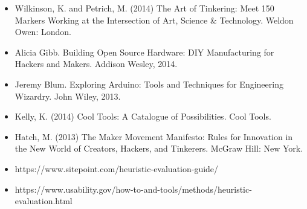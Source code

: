 \documentclass{../fal_assignment}
\begin{document}
\begin{itemize}
     \item Wilkinson, K. and Petrich, M. (2014) The Art of Tinkering: Meet 150 Markers Working at the Intersection of Art, Science \& Technology. Weldon Owen: London.
    \item Alicia Gibb. Building Open Source Hardware: DIY Manufacturing for Hackers and Makers. Addison Wesley, 2014. 
    \item Jeremy Blum. Exploring Arduino: Tools and Techniques for Engineering Wizardry. John Wiley, 2013. 
    \item Kelly, K. (2014) Cool Tools: A Catalogue of Possibilities. Cool Tools.
    \item Hatch, M. (2013) The Maker Movement Manifesto: Rules for Innovation in the New World of Creators, Hackers, and Tinkerers. McGraw Hill: New York.
    \item https://www.sitepoint.com/heuristic-evaluation-guide/
    \item https://www.usability.gov/how-to-and-tools/methods/heuristic-evaluation.html
    
\end{itemize}
\end{document}
